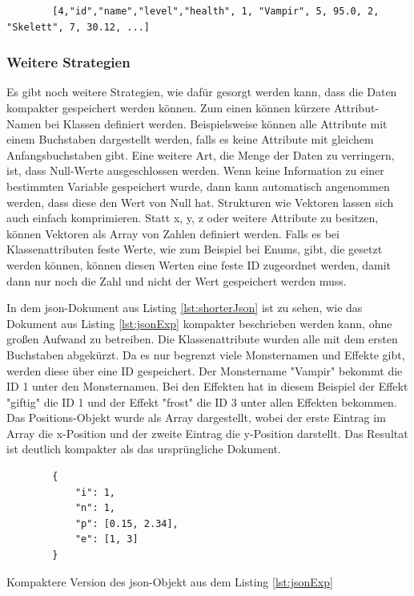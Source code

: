 \begin{listing}[htp]
    \begin{verbatim} 
        [4,"id","name","level","health", 1, "Vampir", 5, 95.0, 2, "Skelett", 7, 30.12, ...]                  
    \end{verbatim}
    \caption{}
    \label{lst:hpackCompressedExp}
\end{listing}

\subsubsection{Weitere Strategien}
Es gibt noch weitere Strategien, wie dafür gesorgt werden kann, dass die Daten kompakter gespeichert werden können. Zum einen können kürzere Attribut-Namen bei Klassen definiert werden. Beispielsweise können alle Attribute mit einem Buchstaben dargestellt werden, falls es keine Attribute mit gleichem Anfangsbuchstaben gibt. Eine weitere Art, die Menge der Daten zu verringern, ist, dass Null-Werte ausgeschlossen werden. Wenn keine Information zu einer bestimmten Variable gespeichert wurde, dann kann automatisch angenommen werden, dass diese den Wert von Null hat. Strukturen wie Vektoren lassen sich auch einfach komprimieren. Statt x, y, z oder weitere Attribute zu besitzen, können Vektoren als Array von Zahlen definiert werden. Falls es bei Klassenattributen feste Werte, wie zum Beispiel bei Enums, gibt, die gesetzt werden können, können diesen Werten eine feste ID zugeordnet werden, damit dann nur noch die Zahl und nicht der Wert gespeichert werden muss.\cite{objelean2011json}\cite{baeldungReducingJSON}

In dem \ac{json}-Dokument aus Listing \ref{lst:shorterJson} ist zu sehen, wie das Dokument aus Listing \ref{lst:jsonExp} kompakter beschrieben werden kann, ohne großen Aufwand zu betreiben. Die Klassenattribute wurden alle mit dem ersten Buchstaben abgekürzt. Da es nur begrenzt viele Monsternamen und Effekte gibt, werden diese über eine ID gespeichert. Der Monstername "Vampir" bekommt die ID 1 unter den Monsternamen. Bei den Effekten hat in diesem Beispiel der Effekt "giftig" die ID 1 und der Effekt "frost" die ID 3 unter allen Effekten bekommen. Das Positions-Objekt wurde als Array dargestellt, wobei der erste Eintrag im Array die x-Position und der zweite Eintrag die y-Position darstellt. Das Resultat ist deutlich kompakter als das ursprüngliche Dokument.

\begin{listing}[htp]
    \begin{verbatim}
        {
            "i": 1,
            "n": 1,
            "p": [0.15, 2.34],
            "e": [1, 3]
        }
    \end{verbatim}
    \caption{Kompaktere Version des \ac{json}-Objekt aus dem Listing \ref{lst:jsonExp}}
    \label{lst:shorterJson}
\end{listing}




